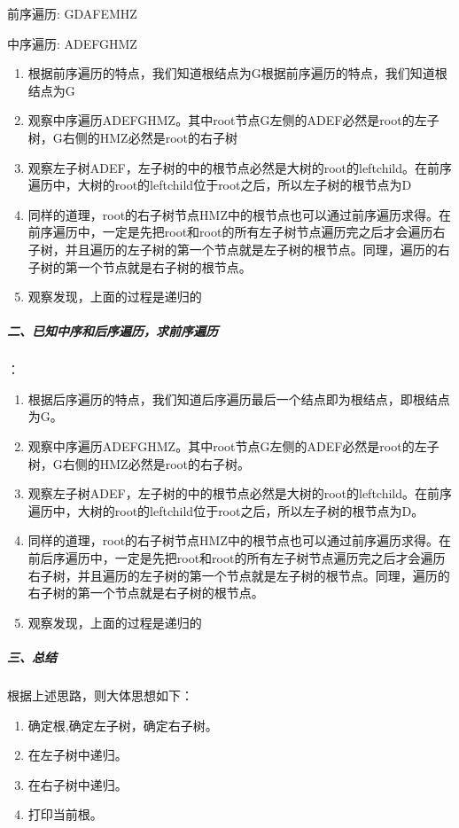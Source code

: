 \documentclass[UTF8,a4paper,12pt]{ctexbook}
\begin{document}
			前序遍历:         GDAFEMHZ
			
			中序遍历:         ADEFGHMZ
			
			\begin{enumerate}[itemindent = 1em]
				\item 根据前序遍历的特点，我们知道根结点为G根据前序遍历的特点，我们知道根结点为G
				\item 观察中序遍历ADEFGHMZ。其中root节点G左侧的ADEF必然是root的左子树，G右侧的HMZ必然是root的右子树
				\item 观察左子树ADEF，左子树的中的根节点必然是大树的root的leftchild。在前序遍历中，大树的root的leftchild位于root之后，所以左子树的根节点为D
				\item 同样的道理，root的右子树节点HMZ中的根节点也可以通过前序遍历求得。在前序遍历中，一定是先把root和root的所有左子树节点遍历完之后才会遍历右子树，并且遍历的左子树的第一个节点就是左子树的根节点。同理，遍历的右子树的第一个节点就是右子树的根节点。
				\item 观察发现，上面的过程是递归的
			\end{enumerate}
		
		\subparagraph{二、已知中序和后序遍历，求前序遍历}：
		
			\begin{enumerate}[itemindent = 1em]
				\item 根据后序遍历的特点，我们知道后序遍历最后一个结点即为根结点，即根结点为G。
				\item 观察中序遍历ADEFGHMZ。其中root节点G左侧的ADEF必然是root的左子树，G右侧的HMZ必然是root的右子树。
				\item 观察左子树ADEF，左子树的中的根节点必然是大树的root的leftchild。在前序遍历中，大树的root的leftchild位于root之后，所以左子树的根节点为D。
				\item 同样的道理，root的右子树节点HMZ中的根节点也可以通过前序遍历求得。在前后序遍历中，一定是先把root和root的所有左子树节点遍历完之后才会遍历右子树，并且遍历的左子树的第一个节点就是左子树的根节点。同理，遍历的右子树的第一个节点就是右子树的根节点。
				\item 观察发现，上面的过程是递归的
			\end{enumerate}
		
		\subparagraph{三、总结}
			根据上述思路，则大体思想如下：
			
			\begin{enumerate}[itemindent = 1em]
				\item 确定根,确定左子树，确定右子树。
				\item 在左子树中递归。
				\item 在右子树中递归。
				\item 打印当前根。
			\end{enumerate}
			
\end{document}
